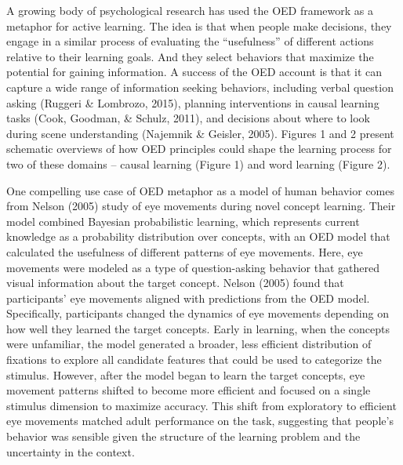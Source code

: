 \documentclass[english,floatsintext,man]{apa6}
\theoremstyle{definition}
\theoremstyle{definition}
\theoremstyle{definition}
\theoremstyle{remark}
\begin{document}
A growing body of psychological research has used the OED framework as a
metaphor for active learning. The idea is that when people make
decisions, they engage in a similar process of evaluating the
\enquote{usefulness} of different actions relative to their learning
goals. And they select behaviors that maximize the potential for gaining
information. A success of the OED account is that it can capture a wide
range of information seeking behaviors, including verbal question asking
(Ruggeri \& Lombrozo, 2015), planning interventions in causal learning
tasks (Cook, Goodman, \& Schulz, 2011), and decisions about where to
look during scene understanding (Najemnik \& Geisler, 2005). Figures 1
and 2 present schematic overviews of how OED principles could shape the
learning process for two of these domains -- causal learning (Figure 1)
and word learning (Figure 2).

One compelling use case of OED metaphor as a model of human behavior
comes from Nelson (2005) study of eye movements during novel concept
learning. Their model combined Bayesian probabilistic learning, which
represents current knowledge as a probability distribution over
concepts, with an OED model that calculated the usefulness of different
patterns of eye movements. Here, eye movements were modeled as a type of
question-asking behavior that gathered visual information about the
target concept. Nelson (2005) found that participants' eye movements
aligned with predictions from the OED model. Specifically, participants
changed the dynamics of eye movements depending on how well they learned
the target concepts. Early in learning, when the concepts were
unfamiliar, the model generated a broader, less efficient distribution
of fixations to explore all candidate features that could be used to
categorize the stimulus. However, after the model began to learn the
target concepts, eye movement patterns shifted to become more efficient
and focused on a single stimulus dimension to maximize accuracy. This
shift from exploratory to efficient eye movements matched adult
performance on the task, suggesting that people's behavior was sensible
given the structure of the learning problem and the uncertainty in the
context.
\end{document}
